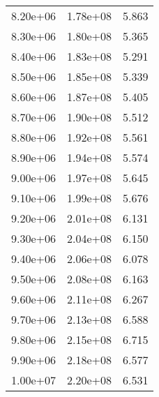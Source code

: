 \begin{table}
\begin{tabular}{lll}
8.20e+06 & 1.78e+08 & 5.863 \\
8.30e+06 & 1.80e+08 & 5.365 \\
8.40e+06 & 1.83e+08 & 5.291 \\
8.50e+06 & 1.85e+08 & 5.339 \\
8.60e+06 & 1.87e+08 & 5.405 \\
8.70e+06 & 1.90e+08 & 5.512 \\
8.80e+06 & 1.92e+08 & 5.561 \\
8.90e+06 & 1.94e+08 & 5.574 \\
9.00e+06 & 1.97e+08 & 5.645 \\
9.10e+06 & 1.99e+08 & 5.676 \\
9.20e+06 & 2.01e+08 & 6.131 \\
9.30e+06 & 2.04e+08 & 6.150 \\
9.40e+06 & 2.06e+08 & 6.078 \\
9.50e+06 & 2.08e+08 & 6.163 \\
9.60e+06 & 2.11e+08 & 6.267 \\
9.70e+06 & 2.13e+08 & 6.588 \\
9.80e+06 & 2.15e+08 & 6.715 \\
9.90e+06 & 2.18e+08 & 6.577 \\
1.00e+07 & 2.20e+08 & 6.531 \\
\bottomrule
\end{tabular}
\end{table}
